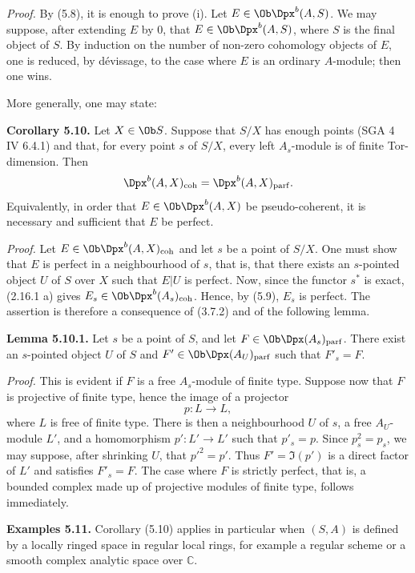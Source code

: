 \documentclass[11pt]{article}
\begin{document}
\emph{Proof.} By (5.8), it is enough to prove (i). Let \(E\in\Ob\Dpx^b(A,S)\). We may suppose, after extending \(E\) by \(0\), that \(E\in\Ob\Dpx^b(A,S)\), where \(S\) is the final object of \(S\). By induction on the number of non-zero cohomology objects of \(E\), one is reduced, by dévissage, to the case where \(E\) is an ordinary \(A\)-module; then one wins.

More generally, one may state:

\textbf{Corollary 5.10.} Let \(X\in\Ob S\). Suppose that \(S/X\) has enough points (SGA 4 IV 6.4.1) and that, for every point \(s\) of \(S/X\), every left \(A_s\)-module is of finite Tor-dimension. Then
\[
  \Dpx^b(A,X)_{\mathrm{coh}}=\Dpx^b(A,X)_{\mathrm{parf}}.
\]
Equivalently, in order that \(E\in\Ob\Dpx^b(A,X)\) be pseudo-coherent, it is necessary and sufficient that \(E\) be perfect.

\emph{Proof.} Let \(E\in\Ob\Dpx^b(A,X)_{\mathrm{coh}}\) and let \(s\) be a point of \(S/X\). One must show that \(E\) is perfect in a neighbourhood of \(s\), that is, that there exists an \(s\)-pointed object \(U\) of \(S\) over \(X\) such that \(E|U\) is perfect. Now, since the functor \(s^*\) is exact, (2.16.1 a) gives \(E_s\in\Ob\Dpx^b(A_s)_{\mathrm{coh}}\). Hence, by (5.9), \(E_s\) is perfect. The assertion is therefore a consequence of (3.7.2) and of the following lemma.

\textbf{Lemma 5.10.1.} Let \(s\) be a point of \(S\), and let \(F\in\Ob\Dpx(A_s)_{\mathrm{parf}}\). There exist an \(s\)-pointed object \(U\) of \(S\) and \(F'\in\Ob\Dpx(A_U)_{\mathrm{parf}}\) such that \(F'_s=F\).

\emph{Proof.} This is evident if \(F\) is a free \(A_s\)-module of finite type. Suppose now that \(F\) is projective of finite type, hence the image of a projector
\[
  p:L\longrightarrow L,
\]
where \(L\) is free of finite type. There is then a neighbourhood \(U\) of \(s\), a free \(A_U\)-module \(L'\), and a homomorphism \(p':L'\to L'\) such that \(p'_s=p\). Since \(p_s^2=p_s\), we may suppose, after shrinking \(U\), that \(p'^2=p'\). Thus \(F'=\Im(p')\) is a direct factor of \(L'\) and satisfies \(F'_s=F\). The case where \(F\) is strictly perfect, that is, a bounded complex made up of projective modules of finite type, follows immediately.

\textbf{Examples 5.11.} Corollary (5.10) applies in particular when \((S,A)\) is defined by a locally ringed space in regular local rings, for example a regular scheme or a smooth complex analytic space over \(\mathbb C\).
\end{document}
